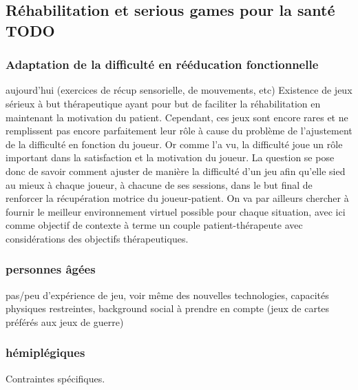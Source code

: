 \subsection{Réhabilitation et serious games pour la santé TODO}

		\subsubsection{Adaptation de la difficulté en rééducation fonctionnelle }
		aujourd'hui (exercices de récup sensorielle, de mouvements, etc)
Existence de jeux sérieux à but thérapeutique ayant pour but de faciliter la réhabilitation en maintenant la motivation du patient. Cependant, ces jeux sont encore rares et ne remplissent pas encore parfaitement leur rôle à cause du problème de l'ajustement de la difficulté en fonction du joueur.
Or comme l'a vu, la difficulté joue un rôle important dans la satisfaction et la motivation du joueur. La question se pose donc de savoir comment ajuster de manière la difficulté d'un jeu afin qu'elle sied au mieux à chaque joueur, à chacune de ses sessions, dans le but final de renforcer la récupération motrice du joueur-patient. On va par ailleurs chercher à fournir le meilleur environnement virtuel possible pour chaque situation, avec ici comme objectif de contexte à terme un couple patient-thérapeute avec considérations des objectifs thérapeutiques. 
		
		\subsubsection{personnes âgées}
pas/peu d'expérience de jeu, voir même des nouvelles technologies, capacités physiques restreintes, background social à prendre en compte (jeux de cartes préférés aux jeux de guerre)
		\subsubsection{hémiplégiques}		
Contraintes spécifiques.